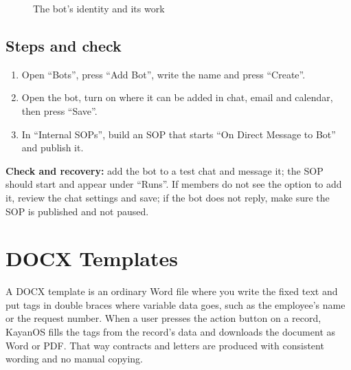 \begin{figure}[H]
\centering
{}
\rclegend
\caption{The bot's identity and its work}
\label{fig:builder-bots-model}
\end{figure}

\subsection{Steps and check}
\begin{enumerate}
\item Open “Bots”, press “Add Bot”, write the name and press “Create”.
\item Open the bot, turn on where it can be added in chat, email and calendar, then press “Save”.
\item In “Internal SOPs”, build an SOP that starts “On Direct Message to Bot” and publish it.
\end{enumerate}

\textbf{Check and recovery:} add the bot to a test chat and message it; the SOP should start and appear under “Runs”. If members do not see the option to add it, review the chat settings and save; if the bot does not reply, make sure the SOP is published and not paused.

\clearpage
\section{DOCX Templates}
\label{sec:builder-feature-docx-templates}

A DOCX template is an ordinary Word file where you write the fixed text and put tags in double braces where variable data goes, such as the employee's name or the request number. When a user presses the action button on a record, KayanOS fills the tags from the record's data and downloads the document as Word or PDF. That way contracts and letters are produced with consistent wording and no manual copying.

